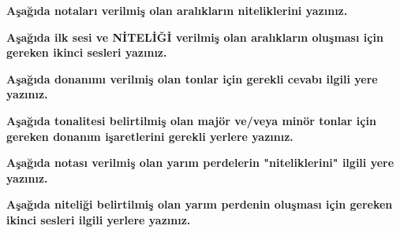 \documentclass[a4paper,addpoints,12pt]{exam}
\begin{document}
\begin{center}
\end{center}
\vspace{0.1in}
\vspace{0.1in}
\vspace{0.1in}

\begin{questions}
\question[50]
\textbf{Aşağıda notaları verilmiş olan aralıkların niteliklerini yazınız.}

\question[50]
\textbf{Aşağıda ilk sesi ve NİTELİĞİ verilmiş olan aralıkların oluşması için gereken ikinci sesleri yazınız.}



\question[50]
\textbf{Aşağıda donanımı verilmiş olan tonlar için gerekli cevabı ilgili yere yazınız.}


\question[50]
\textbf{Aşağıda tonalitesi belirtilmiş olan majör ve/veya minör tonlar için gereken donanım işaretlerini gerekli yerlere yazınız.}

\question[50]
\textbf{Aşağıda notası verilmiş olan yarım perdelerin "niteliklerini" ilgili yere yazınız.}

\question[50]
\textbf{Aşağıda niteliği belirtilmiş olan yarım perdenin oluşması için gereken ikinci sesleri ilgili yerlere yazınız.}







\end{questions}
\end{document}
